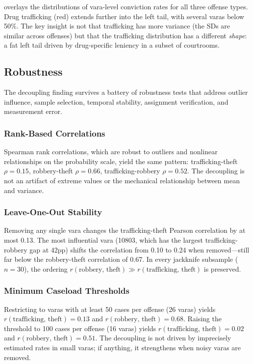 \documentclass[12pt]{article}
\begin{document}
 overlays the distributions of vara-level conviction rates for all three offense types. Drug trafficking (red) extends further into the left tail, with several varas below 50\%. The key insight is not that trafficking has more variance (the SDs are similar across offenses) but that the trafficking distribution has a different \textit{shape}: a fat left tail driven by drug-specific leniency in a subset of courtrooms.

\subsection{Robustness}

The decoupling finding survives a battery of robustness tests that address outlier influence, sample selection, temporal stability, assignment verification, and measurement error.

\subsubsection*{Rank-Based Correlations} Spearman rank correlations, which are robust to outliers and nonlinear relationships on the probability scale, yield the same pattern: trafficking-theft $\rho = 0.15$, robbery-theft $\rho = 0.66$, trafficking-robbery $\rho = 0.52$. The decoupling is not an artifact of extreme values or the mechanical relationship between mean and variance.

\subsubsection*{Leave-One-Out Stability} Removing any single vara changes the trafficking-theft Pearson correlation by at most 0.13. The most influential vara (10803, which has the largest trafficking-robbery gap at 42pp) shifts the correlation from 0.10 to 0.24 when removed---still far below the robbery-theft correlation of 0.67. In every jackknife subsample ($n = 30$), the ordering $r(\text{robbery, theft}) \gg r(\text{trafficking, theft})$ is preserved.

\subsubsection*{Minimum Caseload Thresholds} Restricting to varas with at least 50 cases per offense (26 varas) yields $r(\text{trafficking, theft}) = 0.13$ and $r(\text{robbery, theft}) = 0.68$. Raising the threshold to 100 cases per offense (16 varas) yields $r(\text{trafficking, theft}) = 0.02$ and $r(\text{robbery, theft}) = 0.51$. The decoupling is not driven by imprecisely estimated rates in small varas; if anything, it strengthens when noisy varas are removed.
\end{document}

